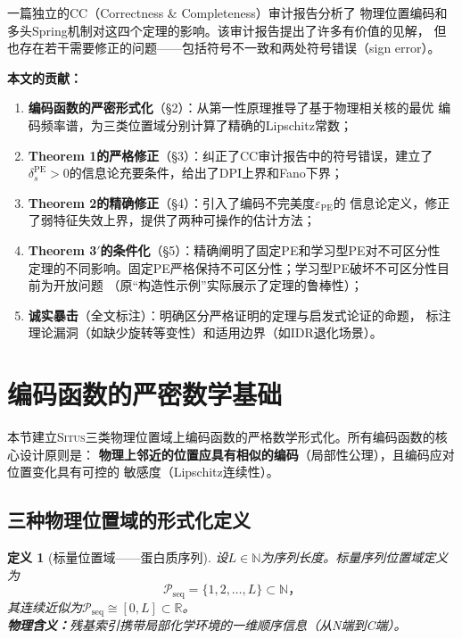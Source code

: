 \documentclass[11pt,a4paper]{article}
\newtheorem{definition}[theorem]{定义}
\theoremstyle{remark}
\DeclareMathOperator{\PE}{PE}
\newcommand{\R}{\mathbb{R}}
\newcommand{\N}{\mathbb{N}}
\newcommand{\Ppos}{\mathcal{P}}
\newcommand{\Situs}{\textsc{Situs}}
\begin{document}
一篇独立的CC（Correctness \& Completeness）审计报告\cite{scx2026cc_audit}分析了
物理位置编码和多头Spring机制对这四个定理的影响。该审计报告提出了许多有价值的见解，
但也存在若干需要修正的问题——包括符号不一致和两处符号错误（sign error）。

\textbf{本文的贡献：}
\begin{enumerate}[label=(\arabic*)]
    \item \textbf{编码函数的严密形式化}（\S2）：从第一性原理推导了基于物理相关核的最优
          编码频率谱，为三类位置域分别计算了精确的Lipschitz常数；
    \item \textbf{Theorem 1的严格修正}（\S3）：纠正了CC审计报告中的符号错误，建立了
          $\delta_s^{\PE} > 0$的信息论充要条件，给出了DPI上界和Fano下界；
    \item \textbf{Theorem 2的精确修正}（\S4）：引入了编码不完美度$\varepsilon_{\PE}$的
          信息论定义，修正了弱特征失效上界，提供了两种可操作的估计方法；
    \item \textbf{Theorem 3$'$的条件化}（\S5）：精确阐明了固定PE和学习型PE对不可区分性
          定理的不同影响。固定PE严格保持不可区分性；学习型PE破坏不可区分性目前为开放问题
          （原``构造性示例''实际展示了定理的鲁棒性）；
    \item \textbf{诚实暴击}（全文标注）：明确区分严格证明的定理与启发式论证的命题，
          标注理论漏洞（如缺少旋转等变性）和适用边界（如IDR退化场景）。
\end{enumerate}

\section{编码函数的严密数学基础}

本节建立\Situs{}三类物理位置域上编码函数的严格数学形式化。所有编码函数的核心设计原则是：
\textbf{物理上邻近的位置应具有相似的编码}（局部性公理），且编码应对位置变化具有可控的
敏感度（Lipschitz连续性）。

\subsection{三种物理位置域的形式化定义}

\begin{definition}[标量位置域——蛋白质序列]
\label{def:1.1.1}
设$L \in \N$为序列长度。标量序列位置域定义为
\begin{equation}
    \Ppos_{\text{seq}} = \{1, 2, \ldots, L\} \subset \N，
\end{equation}
其连续近似为$\Ppos_{\text{seq}} \cong [0, L] \subset \R$。\\
\textbf{物理含义：}残基索引携带局部化学环境的一维顺序信息（从N端到C端）。
\end{definition}
\end{document}
